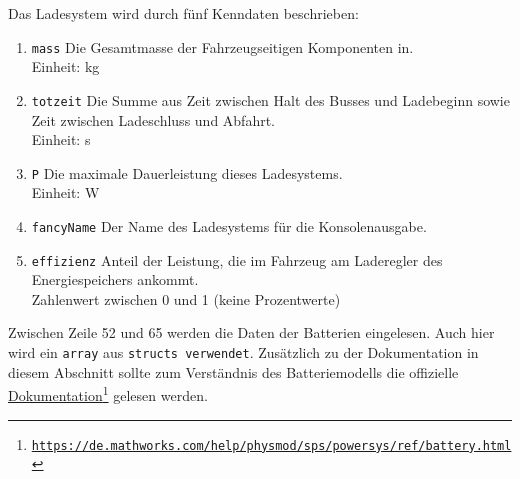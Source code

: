 Das Ladesystem wird durch fünf Kenndaten beschrieben:
\begin{enumerate}
	\item \texttt{mass} Die Gesamtmasse der Fahrzeugseitigen Komponenten in.\\
	Einheit: kg
	\item \texttt{totzeit} Die Summe aus Zeit zwischen Halt des Busses und Ladebeginn sowie Zeit zwischen Ladeschluss und Abfahrt.\\
	Einheit: s
	\item \texttt{P} Die maximale Dauerleistung dieses Ladesystems.\\
	Einheit: W
	\item \texttt{fancyName} Der Name des Ladesystems für die Konsolenausgabe.
	\item \texttt{effizienz} Anteil der Leistung, die im Fahrzeug am Laderegler des Energiespeichers ankommt.\\
	Zahlenwert zwischen 0 und 1 (keine Prozentwerte)
\end{enumerate}

Zwischen Zeile 52 und 65 werden die Daten der Batterien eingelesen. Auch hier wird ein \texttt{array} aus \texttt{structs verwendet}. Zusätzlich zu der Dokumentation in diesem Abschnitt sollte zum Verständnis des Batteriemodells die offizielle \href{https://de.mathworks.com/help/physmod/sps/powersys/ref/battery.html}{Dokumentation}\footnote{\href{https://de.mathworks.com/help/physmod/sps/powersys/ref/battery.html}{\texttt{https://de.mathworks.com/help/physmod/sps/powersys/ref/battery.html}}} gelesen werden.

